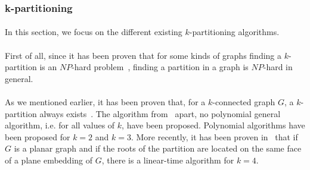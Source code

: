 \subsubsection{k-partitioning}
\paragraph{}
In this section, we focus on the different existing
$k$-partitioning algorithms.

\paragraph{}
First of all, since it has been proven that for some kinds of graphs finding a
$k$-partition is an $NP$-hard problem~\cite{BF06}, finding a partition in a
graph is $NP$-hard in general.

\paragraph{}
As we mentioned earlier, it has been proven that, for a $k$-connected graph
$G$, a $k$-partition always exists~\cite{GE78,LL77}. The algorithm
from~\cite{JS94} apart, no polynomial general algorithm, i.e. for all values of
$k$, have been proposed. Polynomial algorithms have been proposed for
$k=2$\cite{Suzuki1990227} and $k=3$\cite{Wada1994}. More recently, it has
been proven in~\cite{Nakano1997315} that if $G$ is a planar graph and if the
roots of the partition are located on the same face of a plane embedding of $G$,
there is a linear-time algorithm for $k = 4$.


